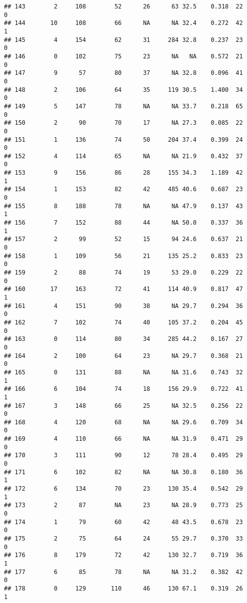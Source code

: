 \documentclass[
]{article}
\begin{document}
\begin{verbatim}
## 143        2     108        52      26      63 32.5    0.318  22    0
## 144       10     108        66      NA      NA 32.4    0.272  42    1
## 145        4     154        62      31     284 32.8    0.237  23    0
## 146        0     102        75      23      NA   NA    0.572  21    0
## 147        9      57        80      37      NA 32.8    0.096  41    0
## 148        2     106        64      35     119 30.5    1.400  34    0
## 149        5     147        78      NA      NA 33.7    0.218  65    0
## 150        2      90        70      17      NA 27.3    0.085  22    0
## 151        1     136        74      50     204 37.4    0.399  24    0
## 152        4     114        65      NA      NA 21.9    0.432  37    0
## 153        9     156        86      28     155 34.3    1.189  42    1
## 154        1     153        82      42     485 40.6    0.687  23    0
## 155        8     188        78      NA      NA 47.9    0.137  43    1
## 156        7     152        88      44      NA 50.0    0.337  36    1
## 157        2      99        52      15      94 24.6    0.637  21    0
## 158        1     109        56      21     135 25.2    0.833  23    0
## 159        2      88        74      19      53 29.0    0.229  22    0
## 160       17     163        72      41     114 40.9    0.817  47    1
## 161        4     151        90      38      NA 29.7    0.294  36    0
## 162        7     102        74      40     105 37.2    0.204  45    0
## 163        0     114        80      34     285 44.2    0.167  27    0
## 164        2     100        64      23      NA 29.7    0.368  21    0
## 165        0     131        88      NA      NA 31.6    0.743  32    1
## 166        6     104        74      18     156 29.9    0.722  41    1
## 167        3     148        66      25      NA 32.5    0.256  22    0
## 168        4     120        68      NA      NA 29.6    0.709  34    0
## 169        4     110        66      NA      NA 31.9    0.471  29    0
## 170        3     111        90      12      78 28.4    0.495  29    0
## 171        6     102        82      NA      NA 30.8    0.180  36    1
## 172        6     134        70      23     130 35.4    0.542  29    1
## 173        2      87        NA      23      NA 28.9    0.773  25    0
## 174        1      79        60      42      48 43.5    0.678  23    0
## 175        2      75        64      24      55 29.7    0.370  33    0
## 176        8     179        72      42     130 32.7    0.719  36    1
## 177        6      85        78      NA      NA 31.2    0.382  42    0
## 178        0     129       110      46     130 67.1    0.319  26    1

\end{verbatim}
\end{document}
